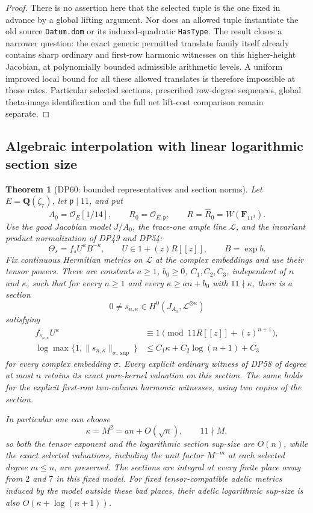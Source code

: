 \documentclass[11pt,a4paper]{article}
\newtheorem{theorem}{Theorem}[section]
\theoremstyle{definition}\newtheorem{remark}[theorem]{Remark}
\begin{document}
\begin{proof}
There is no assertion here that the selected tuple is the one fixed in advance by a global lifting argument. Nor does an allowed tuple instantiate the old source \texttt{Datum.dom} or its induced-quadratic \texttt{HasType}. The result closes a narrower question: the exact generic permitted translate family itself already contains sharp ordinary and first-row harmonic witnesses on this higher-height Jacobian, at polynomially bounded admissible arithmetic levels. A uniform improved local bound for all these allowed translates is therefore impossible at those rates. Particular selected sections, prescribed row-degree sequences, global theta-image identification and the full net lift-cost comparison remain separate.

\end{proof}


\subsection{Algebraic interpolation with linear logarithmic section size}

\begin{theorem}[DP60: bounded representatives and section norms]\label{DP60}
Let $E=\mathbf Q(\zeta_7)$, let $\mathfrak p\mid11$, and put
\[
 A_0=\mathcal O_E[1/14],\qquad
 R_0=\mathcal O_{E,\mathfrak p},\qquad
 R=\widehat R_0=W(\mathbf F_{11^3}).
\]
Use the good Jacobian model $J/A_0$, the trace-one ample line $\mathcal L$, and the invariant product normalization of DP49 and DP54:
\[
 \Theta_s=f_sU^\kappa B^{-\kappa},
 \qquad U\in1+(z)R[[z]],\qquad B=\exp b.
\]
Fix continuous Hermitian metrics on $\mathcal L$ at the complex embeddings and use their tensor powers.
There are constants $a\ge1$, $b_0\ge0$, $C_1,C_2,C_3$, independent of $n$ and $\kappa$, such that for every $n\ge1$ and every $\kappa\ge an+b_0$ with $11\nmid\kappa$, there is a section
\[
 0\ne s_{n,\kappa}\in H^0(J_{A_0},\mathcal L^{\otimes\kappa})
\]
satisfying
\begin{align}
 f_{s_{n,\kappa}}U^\kappa
 &\equiv1\pmod{11R[[z]]+(z)^{n+1}},
 \label{eq:boundedrepresentativejet}\\
 \log\max\{1,\|s_{n,\kappa}\|_{\sigma,\sup}\}
 &\le C_1\kappa+C_2\log(n+1)+C_3
 \label{eq:linearsectionsize}
\end{align}
for every complex embedding $\sigma$.
Every explicit ordinary witness of DP58 of degree at most $n$ retains its exact pure-kernel valuation on this section.
The same holds for the explicit first-row two-column harmonic witnesses, using two copies of the section.

In particular one can choose
\[
 \kappa=M^2=an+O(\sqrt n),\qquad 11\nmid M,
\]
so both the tensor exponent and the logarithmic section sup-size are $O(n)$, while the exact selected valuations, including the unit factor $M^{-m}$ at each selected degree $m\le n$, are preserved.
The sections are integral at every finite place away from $2$ and $7$ in this fixed model.
For fixed tensor-compatible adelic metrics induced by the model outside these bad places, their adelic logarithmic sup-size is also $O(\kappa+\log(n+1))$.
\end{theorem}
\end{document}
